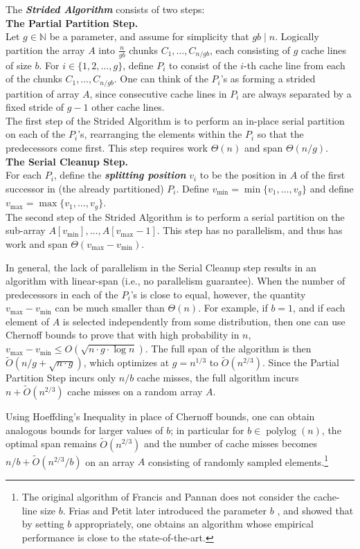 \documentclass[twoside,leqno,twocolumn]{article}
\newcommand{\defn}[1]{{\textit{\textbf{\boldmath #1}}}}
\begin{document}
The \defn{Strided Algorithm} consists of two steps: \\
\textbf{The Partial Partition Step.} \\ 
Let $g \in \mathbb{N}$ be a parameter, and assume for simplicity
that $gb \mid n$. Logically partition the array $A$ into
$\frac{n}{gb}$ chunks $C_1, \ldots, C_{n / gb}$, each consisting
of $g$ cache lines of size $b$. For $i \in \{1, 2, \ldots, g\}$,
define $P_i$ to consist of the $i$-th cache line from each of the
chunks $C_1, \ldots, C_{n / gb}$. One can think of the $P_i$'s as
forming a strided partition of array $A$, since consecutive cache
lines in $P_i$ are always separated by a fixed stride of $g - 1$
other cache lines.\\
The first step of the Strided Algorithm is to perform an in-place
serial partition on each of the $P_i$'s, rearranging the elements
within the $P_i$ so that the predecessors come first. This step
requires work $\Theta(n)$ and span $\Theta(n/g)$.\\
\textbf{The Serial Cleanup Step.} \\ For each $P_i$, define the
\defn{splitting position} $v_i$ to be the position in $A$ of the
first successor in (the already partitioned) $P_i$. Define
$v_{\text{min}} = \min\{v_1, \ldots, v_{g}\}$ and define
$v_{\text{max}} = \max\{v_1, \ldots, v_{g}\}$. \\
The second step of the Strided Algorithm is to perform a serial
partition on the sub-array $A[v_{\text{min}}],\ldots,
A[v_{\text{max}}-1]$. This step has no parallelism, and thus has
work and span $\Theta(v_{\text{max}} - v_{\text{min}})$.

In general, the lack of parallelism in the Serial Cleanup step 
results in an algorithm with linear-span (i.e., no
parallelism guarantee).  When the number of predecessors in each
of the $P_i$'s is close to equal, however, the quantity
$v_{\text{max}} - v_{\text{min}}$ can be much smaller than
$\Theta(n)$. For example, if $b = 1$, and if each element of $A$
is selected independently from some distribution, then one can
use Chernoff bounds to prove that with high probability in $n$,
$v_{\text{max}} - v_{\text{min}} \le O(\sqrt{n \cdot g \cdot \log
n})$.  The full span of the algorithm is then $\tilde{O}(n/g +
\sqrt{n \cdot g})$, which optimizes at $g = n^{1/3}$ to
$\tilde{O}(n^{2/3})$. Since the Partial Partition Step incurs
only $n / b$ cache misses, the full algorithm incurs $n +
\tilde{O}(n^{2/3})$ cache misses on a random array $A$.

Using Hoeffding's Inequality in place of Chernoff bounds, one can
obtain analogous bounds for larger values of $b$; in particular
for $b \in \operatorname{polylog}(n)$, the optimal span remains
$\tilde{O}(n^{2/3})$ and the number of cache misses becomes $n /
b + \tilde{O}(n^{2/3} / b)$ on an array $A$ consisting of
randomly sampled elements.\footnote{The original algorithm of
  Francis and Pannan \cite{FrancisPa92} does not consider the
  cache-line size $b$. Frias and Petit later introduced the
parameter $b$ \cite{Frias08}, and showed that by setting $b$
appropriately, one obtains an algorithm whose empirical
performance is close to the state-of-the-art.}
\end{document}
